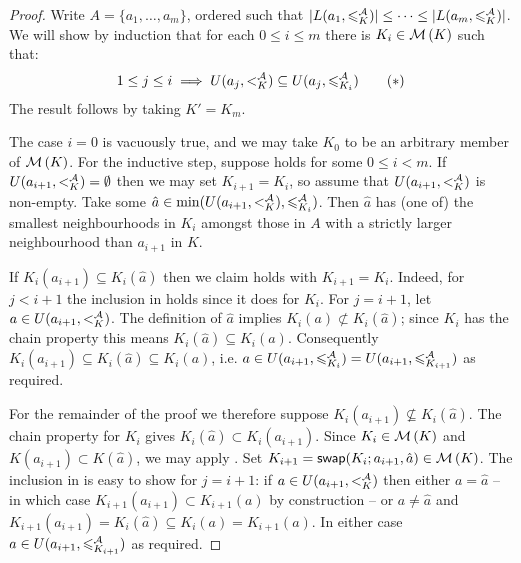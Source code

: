 \begin{proof}
    Write $A = \{a_1,\ldots,a_m\}$, ordered such that $|L(a_1, {\leqslant^{\mathcal{A}}_K})| \le
    \cdots \le |L(a_m, {\leqslant^{\mathcal{A}}_K})|$. We will show by induction that for each $0
    \le i \le m$ there is $K_i \in \operatorname{\mathcal{M}}\left({K}\right)$ such that:
    \[
        1 \le j \le i
        \implies
        U(a_j, {<^{\mathcal{A}}_K}) \subseteq U(a_j, {\leqslant^{\mathcal{A}}_{K_i}})
        \tag{$\ast$}
        \label{tourn_eqn_mon_lemma_induction}
    \]
    The result follows by taking $K' = K_m$.

    The case $i=0$ is vacuously true, and we may take $K_0$ to be an arbitrary
    member of $\operatorname{\mathcal{M}}\left({K}\right)$. For the inductive step, suppose
     holds for some $0 \le i < m$. If
    $U(a_{i+1}, {<^{\mathcal{A}}_K}) = \emptyset$ then we may set $K_{i+1} = K_i$, so
    assume that $U(a_{i+1}, {<^{\mathcal{A}}_K})$ is non-empty. Take some $\hat{a} \in
    \min(U(a_{i+1}, {<^{\mathcal{A}}_K}), {\leqslant^{\mathcal{A}}_{K_i}})$. Then $\hat{a}$ has (one of)
    the smallest neighbourhoods in $K_i$ amongst those in $A$ with a strictly
    larger neighbourhood than $a_{i+1}$ in $K$.

    If $K_i(a_{i+1}) \subseteq K_i(\hat{a})$ then we claim
     holds with $K_{i+1} = K_i$. Indeed, for
    $j < i + 1$ the inclusion in  holds
    since it does for $K_i$. For $j = i+1$, let $a \in U(a_{i+1}, {<^{\mathcal{A}}_K})$.
    The definition of $\hat{a}$ implies $K_i(a) \not\subset K_i(\hat{a})$;
    since $K_i$ has the chain property this means $K_i(\hat{a}) \subseteq
    K_i(a)$. Consequently $K_i(a_{i+1}) \subseteq K_i(\hat{a}) \subseteq
    K_i(a)$, i.e. $a \in U(a_{i+1}, {\leqslant^{\mathcal{A}}_{K_i}}) = U(a_{i+1},
    {\leqslant^{\mathcal{A}}_{K_{i+1}}})$ as required.

    For the remainder of the proof we therefore suppose $K_i(a_{i+1})
    \not\subseteq K_i(\hat{a})$. The chain property for $K_i$ gives
    $K_i(\hat{a}) \subset K_i(a_{i+1})$. Since $K_i \in \operatorname{\mathcal{M}}\left({K}\right)$ and
    $K(a_{i+1}) \subset K(\hat{a})$, we may apply
    . Set $K_{i+1} =
    \mathsf{swap}({K_i}; {a_{i+1}}, {\hat{a}}) \in \operatorname{\mathcal{M}}\left({K}\right)$. The inclusion in
     is easy to show for $j=i+1$: if $a \in
    U(a_{i+1}, {<^{\mathcal{A}}_K})$ then either $a = \hat{a}$ -- in which case
    $K_{i+1}(a_{i+1}) \subset K_{i+1}(a)$ by construction -- or $a \ne \hat{a}$
    and $K_{i+1}(a_{i+1}) = K_i(\hat{a}) \subseteq K_i(a) = K_{i+1}(a)$. In
    either case $a \in U(a_{i+1}, {\leqslant^{\mathcal{A}}_{K_{i+1}}})$ as required.


\end{proof}
